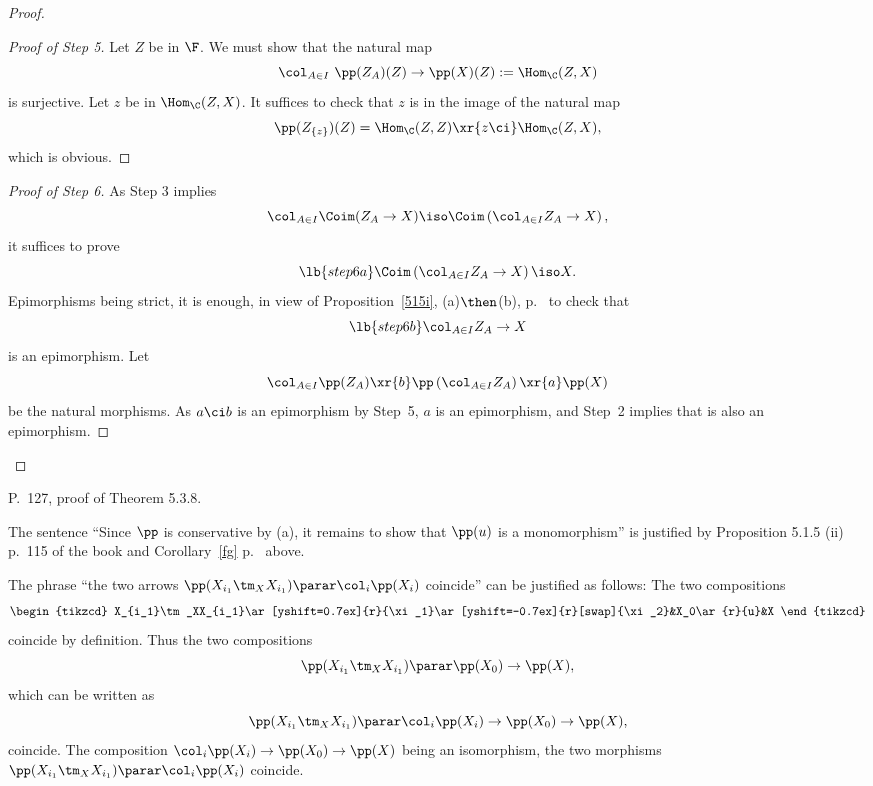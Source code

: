 \documentclass[12pt]{article}
\theoremstyle{remark}
\theoremstyle{definition}
\begin{document}
\begin{proof}
\begin{proof}[Proof of Step 5]
Let $Z$ be in $\F$. We must show that the natural map 
$$
\col_{A\in I}\ \pp(Z_A)(Z)\to\pp(X)(Z):=\Hom_\C(Z,X) 
$$
is surjective. Let $z$ be in $\Hom_\C(Z,X)$. It suffices to check that $z$ is in the image of the natural map 
$$
\pp(Z_{\{z\}})(Z)=\Hom_\C(Z,Z)\xr{z\ci}\Hom_\C(Z,X),
$$
which is obvious. 
\end{proof}

\begin{proof}[Proof of Step 6] 
As Step 3 implies 
$$
\col_{A\in I}\Coim(Z_A\to X)\iso\Coim\left(\col_{A\in I}Z_A\to X\right),
$$ 
it suffices to prove 
\begin{equation}\lb{step6a}
\Coim\left(\col_{A\in I}Z_A\to X\right)\iso X.
\end{equation} 
Epimorphisms being strict, it is enough, in view of Proposition~\ref{515i}, (a)$\then$(b), p.~ to check that 
\begin{equation}\lb{step6b}
\col_{A\in I}Z_A\to X
\end{equation} 
is an epimorphism. Let 
$$
\col_{A\in I}\pp(Z_A)\xr{b}\pp\left(\col_{A\in I}Z_A\right)\xr{a}\pp(X)
$$
be the natural morphisms. As $a\ci b$ is an epimorphism by Step~5, $a$ is an epimorphism, and Step~2 implies that  is also an epimorphism. 
\end{proof}
\end{proof}



\begin{s}
P.~127, proof of Theorem 5.3.8. 

The sentence ``Since $\pp$ is conservative by (a), it remains to show that $\pp(u)$ is a monomorphism'' is justified by Proposition 5.1.5 (ii) p.~115 of the book and Corollary~\ref{fg} p.~ above.

The phrase ``the two arrows $\pp(X_{i_1}\tm_XX_{i_1})\parar\col_i\pp(X_i)$ coincide'' can be justified as follows: The two compositions  
$$
\begin{tikzcd}
X_{i_1}\tm_XX_{i_1}\ar[yshift=0.7ex]{r}{\xi_1}\ar[yshift=-0.7ex]{r}[swap]{\xi_2}&X_0\ar{r}{u}&X
\end{tikzcd}
$$ 
coincide by definition. Thus the two compositions  
$$
\pp(X_{i_1}\tm_XX_{i_1})\parar\pp(X_0)\to\pp(X),
$$ 
which can be written as 
$$
\pp(X_{i_1}\tm_XX_{i_1})\parar\col_i\pp(X_i)\to\pp(X_0)\to\pp(X),
$$
coincide. The composition $\col_i\pp(X_i)\to\pp(X_0)\to\pp(X)$ being an isomorphism, the two morphisms $\pp(X_{i_1}\tm_XX_{i_1})\parar\col_i\pp(X_i)$ coincide.
\end{s}
\end{document}
